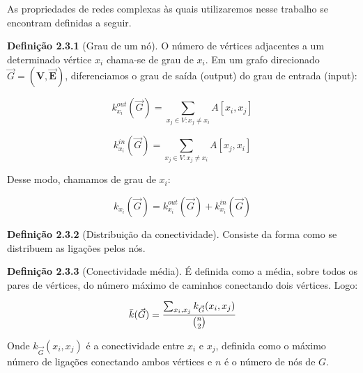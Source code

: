 \documentclass[12pt]{article}
\begin{document}
As propriedades de redes complexas às quais utilizaremos nesse trabalho se encontram definidas a seguir.


\noindent \textbf{Definição 2.3.1} (Grau de um nó). O número de vértices adjacentes a um determinado vértice $x_i$ chama-se de grau de $x_i$. Em um grafo direcionado $\Vec G = (\bm V,\bm \Vec E)$, diferenciamos o grau de saída (output) do grau de entrada (input):

\begin{equation}
k^{out}_{x_{i}}(\Vec{G}) = \sum_{x_j \in V : x_j \neq x_i}^{} A[x_i,x_j]
\label{eq:grauOutput}
\end{equation}

\begin{equation}
k^{in}_{x_{i}}(\Vec{G}) = \sum_{x_j \in V : x_j \neq x_i}^{} A[x_j,x_i]
\label{eq:grauInput}
\end{equation}

Desse modo, chamamos de grau de $x_i$: 

\begin{equation}
k_{x_i}(\Vec{G}) = k^{out}_{x_{i}}(\Vec{G}) + k^{in}_{x_{i}}(\Vec{G})
\label{eq:grau}
\end{equation}

\noindent \textbf{Definição 2.3.2} (Distribuição da conectividade). Consiste da forma como se distribuem as ligações pelos nós.

\noindent \textbf{Definição 2.3.3} (Conectividade média). É definida como a média, sobre todos os pares de vértices, do número máximo de caminhos conectando dois vértices. Logo:

\begin{equation}
\Bar{k}(\Vec{G}) = \frac{\sum_{x_i, x_j}^{} k_{\Vec{G}}(x_i, x_j)}{{n \choose 2}}
\label{eq:grauInput}
\end{equation}

Onde $k_{\Vec{G}}(x_i, x_j)$ é a conectividade entre $x_i$ e $x_j$, definida como o máximo número de ligações conectando ambos vértices e $n$ é o número de nós de $G$.
\end{document}
